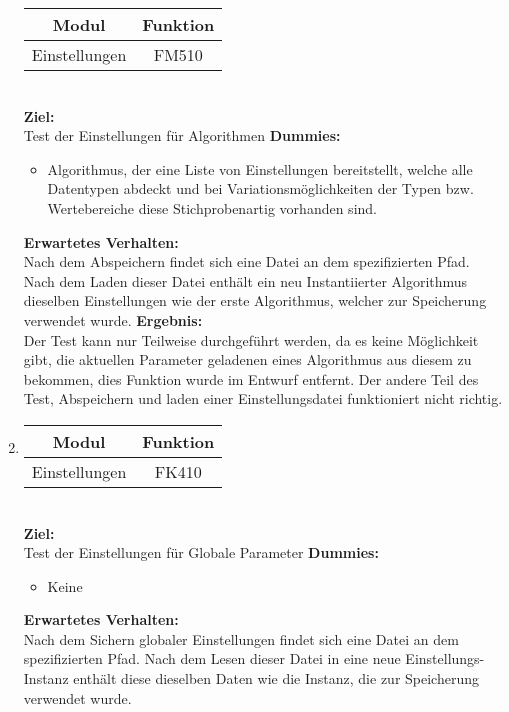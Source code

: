 \begin{enumerate}[align=left, leftmargin=4em, label={\textbf{\textbackslash T2.\arabic*\textbackslash}} ]
\begin{tabular}{|c|c|}
			\hline Modul & Funktion \\
			\hline Einstellungen & FM510 \\
			\hline
		\end{tabular}\\
		\subitem \textbf{Ziel:} \\ Test der Einstellungen für Algorithmen
		\subitem \textbf{Dummies:} \begin{itemize}
			\item Algorithmus, der eine Liste von Einstellungen bereitstellt, welche alle Datentypen abdeckt und bei Variationsmöglichkeiten der Typen bzw. Wertebereiche diese Stichprobenartig vorhanden sind.
		\end{itemize}
		\subitem \textbf{Erwartetes Verhalten:}\\
		Nach dem Abspeichern findet sich eine Datei an dem spezifizierten Pfad. Nach dem Laden dieser Datei enthält ein neu Instantiierter Algorithmus dieselben Einstellungen wie der erste Algorithmus, welcher zur Speicherung verwendet wurde.
		\subitem \textbf{Ergebnis:}\\
		Der Test kann nur Teilweise durchgeführt werden, da es keine Möglichkeit gibt, die aktuellen Parameter geladenen eines Algorithmus aus diesem zu bekommen, dies Funktion wurde im Entwurf entfernt.
		Der andere Teil des Test, Abspeichern und laden einer Einstellungsdatei funktioniert nicht richtig.
		\\\item \begin{tabular}{|c|c|}
			\hline Modul & Funktion \\
			\hline Einstellungen & FK410 \\
			\hline
		\end{tabular}\\
		\subitem \textbf{Ziel:} \\ Test der Einstellungen für Globale Parameter
		\subitem \textbf{Dummies:} \begin{itemize}
			\item Keine
		\end{itemize}
		\subitem \textbf{Erwartetes Verhalten:}\\
		Nach dem Sichern globaler Einstellungen findet sich eine Datei an dem spezifizierten Pfad. Nach dem Lesen dieser Datei in eine neue Einstellungs-Instanz enthält diese dieselben Daten wie die Instanz, die zur Speicherung verwendet wurde.

\end{enumerate}
